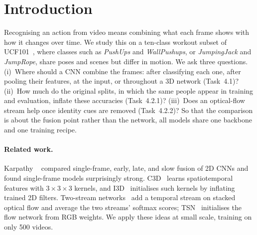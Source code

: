 \section{Introduction}
\label{sec:intro}
Recognising an action from video means combining what each frame shows
with how it changes over time. We study this on a ten-class workout subset
of UCF101~\cite{soomro2012ucf101}, where classes such as \emph{PushUps} and
\emph{WallPushups}, or \emph{JumpingJack} and \emph{JumpRope}, share poses
and scenes but differ in motion. We ask three questions.
(i)~Where should a CNN combine the frames: after classifying each one,
after pooling their features, at the input, or throughout a 3D network
(Task~4.1)?
(ii)~How much do the original splits, in which the same people appear in
training and evaluation, inflate these accuracies (Task~4.2.1)?
(iii)~Does an optical-flow stream help once identity cues are removed
(Task~4.2.2)?
So that the comparison is about the fusion point rather than the network,
all models share one backbone and one training recipe.

\paragraph{Related work.}
Karpathy \etal~\cite{karpathy2014largescale} compared single-frame, early,
late, and slow fusion of 2D CNNs and found single-frame models
surprisingly strong. C3D~\cite{tran2015c3d} learns spatiotemporal features
with $3{\times}3{\times}3$ kernels, and I3D~\cite{carreira2017i3d}
initialises such kernels by inflating trained 2D filters. Two-stream
networks~\cite{simonyan2014twostream} add a temporal stream on stacked
optical flow and average the two streams' softmax scores; TSN~\cite{wang2016tsn}
initialises the flow network from RGB weights. We apply these ideas at small
scale, training on only 500 videos.
